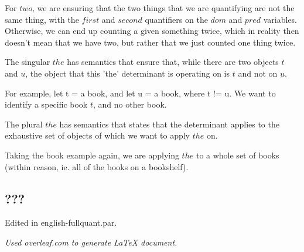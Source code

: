 \documentclass[12pt, letterpaper]{article}
\begin{document}
For $two$, we are ensuring that the two things that we are quantifying are not the same thing, with the $first$ and $second$ quantifiers on the $dom$ and $pred$ variables. Otherwise, we can end up counting a given something twice, which in reality then doesn't mean that we have two, but rather that we just counted one thing twice. 


The singular $the$ has semantics that ensure that, while there are two objects $t$ and $u$, the object that this 'the' determinant is operating on is $t$ and not on $u$. 

For example, let t = a book, and let u = a book, where t != u. We want to identify a specific book $t$, and no other book. 


The plural $the$ has semantics that states that the determinant applies to the exhaustive set of objects of which we want to apply $the$ on. 

Taking the book example again, we are applying $the$ to a whole set of books (within reason, ie. all of the books on a bookshelf). 

\subsection{???}
Edited in english-fullquant.par. %

\begin{center}
\textit{Used overleaf.com to generate LaTeX document.}
\end{center}
\end{document}
